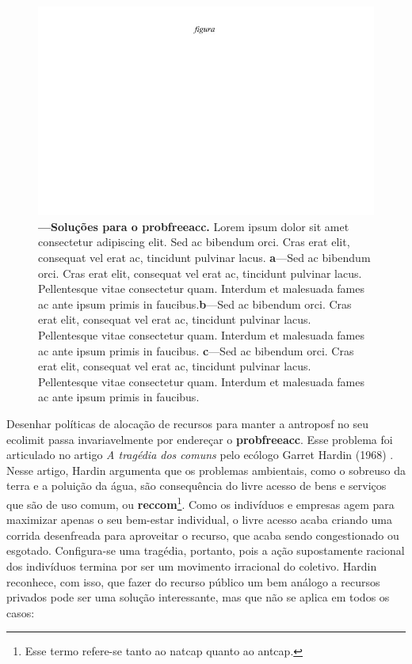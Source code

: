\documentclass[./main.tex]{subfiles}
\begin{document}
\begin{figure}[t!] 
\centering				
\includegraphics[width=0.98\linewidth]{figs/fig_m.jpg}		
\caption[Soluções para o problema do livre acesso]
{\textbf{---\;Soluções para o \gls{probfreeacc}.}
    Lorem ipsum dolor sit amet consectetur adipiscing elit. Sed ac bibendum orci. Cras erat elit, consequat vel erat ac, tincidunt pulvinar lacus. \;\textbf{a}\;---\;Sed ac bibendum orci. Cras erat elit, consequat vel erat ac, tincidunt pulvinar lacus. Pellentesque vitae consectetur quam. Interdum et malesuada fames ac ante ipsum primis in faucibus.\;\textbf{b}\;---\;Sed ac bibendum orci. Cras erat elit, consequat vel erat ac, tincidunt pulvinar lacus. Pellentesque vitae consectetur quam. Interdum et malesuada fames ac ante ipsum primis in faucibus. \;\textbf{c}\;---\;Sed ac bibendum orci. Cras erat elit, consequat vel erat ac, tincidunt pulvinar lacus. Pellentesque vitae consectetur quam. Interdum et malesuada fames ac ante ipsum primis in faucibus.
}
\label{fig:eco:tragedy} 		
\end{figure}

\par Desenhar políticas de alocação de recursos para manter a \gls{antroposf} no seu \gls{ecolimit} passa invariavelmente por endereçar o \textbf{\gls{probfreeacc}}. Esse problema foi articulado no artigo \textit{A tragédia dos comuns} pelo ecólogo Garret Hardin (1968) \cite{Hardin1968a}. Nesse artigo, Hardin argumenta que os problemas ambientais, como o sobreuso da terra e a poluição da água, são consequência do livre acesso de bens e serviços que são de uso comum, ou \textbf{\gls{reccom}}\footnote{Esse termo refere-se tanto ao \gls{natcap} quanto ao \gls{antcap}.}. Como os indivíduos e empresas agem para maximizar apenas o seu bem-estar individual, o livre acesso acaba criando uma corrida desenfreada para aproveitar o recurso, que acaba sendo congestionado ou esgotado. Configura-se uma tragédia, portanto, pois a ação supostamente racional dos indivíduos termina por ser um movimento irracional do coletivo. Hardin reconhece, com isso, que fazer do recurso público um bem análogo a recursos privados pode ser uma solução interessante, mas que não se aplica em todos os casos:
\end{document}
